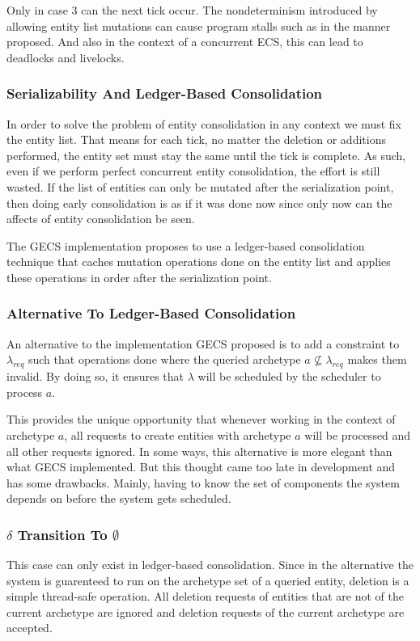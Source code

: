 Only in case 3 can the next tick occur. The nondeterminism introduced by allowing entity list mutations can cause program stalls such as in the manner proposed. And also in the context of a concurrent ECS, this can lead to deadlocks and livelocks.

\subsubsection{Serializability And Ledger-Based Consolidation}
In order to solve the problem of entity consolidation in any context we must fix the entity list. That means for each tick, no matter the deletion or additions performed, the entity set must stay the same until the tick is complete. As such, even if we perform perfect concurrent entity consolidation, the effort is still wasted. If the list of entities can only be mutated after the serialization point, then doing early consolidation is as if it was done now since only now can the affects of entity consolidation be seen. 

The GECS implementation proposes to use a ledger-based consolidation technique that caches mutation operations done on the entity list and applies these operations in order after the serialization point.

\subsubsection{Alternative To Ledger-Based Consolidation}
An alternative to the implementation GECS proposed is to add a constraint to $\lambda_{req}$ such that operations done where the queried archetype $a \not\subseteq \lambda_{req}$ makes them invalid. By doing so, it ensures that $\lambda$ will be scheduled by the scheduler to process $a$. 

This provides the unique opportunity that whenever working in the context of archetype $a$, all requests to create entities with archetype $a$ will be processed and all other requests ignored. In some ways, this alternative is more elegant than what GECS implemented. But this thought came too late in development and has some drawbacks. Mainly, having to know the set of components the system depends on before the system gets scheduled.

\subsubsection{$\delta$ Transition To $\emptyset$}
This case can only exist in ledger-based consolidation. Since in the alternative the system is guarenteed to run on the archetype set of a queried entity, deletion is a simple thread-safe operation. All deletion requests of entities that are not of the current archetype are ignored and deletion requests of the current archetype are accepted.


